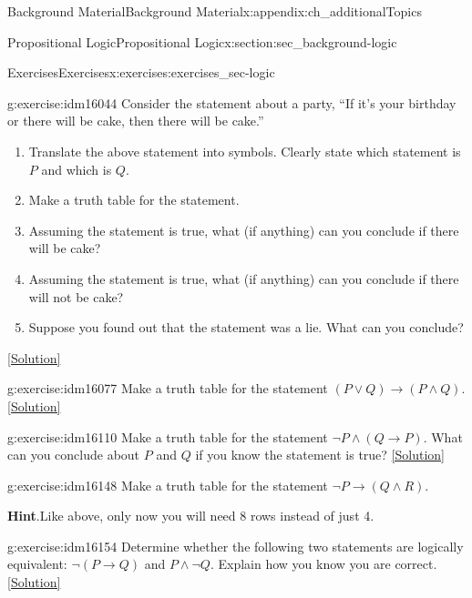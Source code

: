 \documentclass[oneside,10pt,]{book}
\numberwithin{equation}{chapter}
\def\imp{\rightarrow}
\begin{document}
\begin{appendixptx}{Background Material}{}{Background Material}{}{}{x:appendix:ch_additionalTopics}
\begin{sectionptx}{Propositional Logic}{}{Propositional Logic}{}{}{x:section:sec_background-logic}
\begin{exercises-subsection}{Exercises}{}{Exercises}{}{}{x:exercises:exercises_sec-logic}
\begin{divisionexercise}{1}{}{}{g:exercise:idm16044}
Consider the statement about a party, ``If it's your birthday or there will be cake, then there will be cake.''%
\par
%
\begin{enumerate}[label=(\alph*)]
\item{}Translate the above statement into symbols. Clearly state which statement is \(P\) and which is \(Q\).%
\item{}Make a truth table for the statement.%
\item{}Assuming the statement is true, what (if anything) can you conclude if there will be cake?%
\item{}Assuming the statement is true, what (if anything) can you conclude if there will not be cake?%
\item{}Suppose you found out that the statement was a lie. What can you conclude?%
\end{enumerate}
%
\space\hspace*{0pt}\hfill{\tiny\hyperlink{g:solution:idm16062-main}{[Solution]}}\end{divisionexercise}%
\begin{divisionexercise}{2}{}{}{g:exercise:idm16077}%
Make a truth table for the statement \((P \vee Q) \imp (P \wedge Q)\).%
\space\hspace*{0pt}\hfill{\tiny\hyperlink{g:solution:idm16081-main}{[Solution]}}\end{divisionexercise}%
\begin{divisionexercise}{3}{}{}{g:exercise:idm16110}%
Make a truth table for the statement \(\neg P \wedge (Q \imp P)\). What can you conclude about \(P\) and \(Q\) if you know the statement is true?%
\space\hspace*{0pt}\hfill{\tiny\hyperlink{g:solution:idm16116-main}{[Solution]}}\end{divisionexercise}%
\begin{divisionexercise}{4}{}{}{g:exercise:idm16148}%
Make a truth table for the statement \(\neg P \imp (Q \wedge R)\).%
\par\smallskip%
\noindent\textbf{Hint}.\hypertarget{g:hint:idm16152}{}\quad{}Like above, only now you will need 8 rows instead of just 4.%
\end{divisionexercise}%
\begin{divisionexercise}{5}{}{}{g:exercise:idm16154}%
Determine whether the following two statements are logically equivalent:  \(\neg(P \imp Q)\) and \(P \wedge \neg Q\). Explain how you know you are correct.%
\space\hspace*{0pt}\hfill{\tiny\hyperlink{g:solution:idm16159-main}{[Solution]}}\end{divisionexercise}%

\end{exercises-subsection}
\end{sectionptx}
\end{appendixptx}
\end{document}
